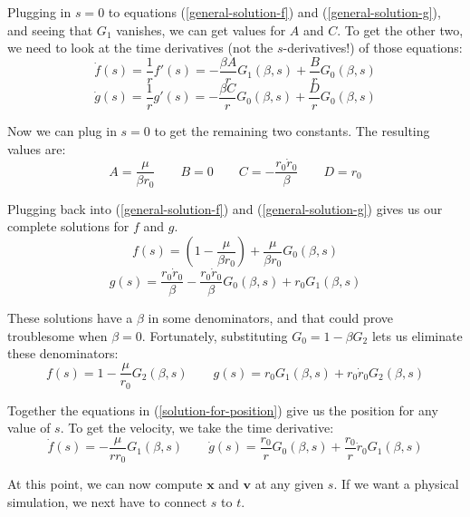 \documentclass{article}
\numberwithin{equation}{subsection}
\begin{document}
Plugging in $s = 0$ to equations (\ref{general-solution-f}) and (\ref{general-solution-g}), and seeing that $G_1$ vanishes, we can get values for $A$ and $C$. To get the other two, we need to look at the time derivatives (not the $s$-derivatives!) of those equations:
\begin{equation}
\dot{f}(s) = \frac{1}{r} f'(s) = -\frac{\beta A}{r} G_1(\beta, s) + \frac{B}{r} G_0(\beta, s)
\end{equation}
\begin{equation}
\dot{g}(s) = \frac{1}{r} g'(s) = -\frac{\beta C}{r} G_0(\beta, s) + \frac{D}{r} G_0(\beta, s)
\end{equation}

Now we can plug in $s = 0$ to get the remaining two constants. The resulting values are:
\begin{equation}
A = \frac{\mu}{\beta r_0} \qquad B = 0 \qquad C = -\frac{r_0 \dot{r}_0}{\beta} \qquad D = r_0
\end{equation}

Plugging back into (\ref{general-solution-f}) and (\ref{general-solution-g}) gives us our complete solutions for $f$ and $g$.
\begin{equation}
f(s) = \left( 1 - \frac{\mu}{\beta r_0} \right) + \frac{\mu}{\beta r_0} G_0(\beta, s)
\end{equation}
\begin{equation}
g(s) = \frac{r_0 \dot{r}_0}{\beta} - \frac{r_0 \dot{r}_0}{\beta} G_0(\beta, s) + r_0 G_1(\beta, s)
\end{equation}

These solutions have a $\beta$ in some denominators, and that could prove troublesome when $\beta = 0$.
Fortunately, substituting $G_0 = 1 - \beta G_2$ lets us eliminate these denominators:
\begin{equation}
\label{solution-for-position}
f(s) = 1 - \frac{\mu}{r_0} G_2(\beta, s)
\qquad
g(s) = r_0 G_1(\beta, s) + r_0 \dot{r}_0 G_2(\beta, s)
\end{equation}

Together the equations in (\ref{solution-for-position}) give us the position for any value of $s$. To get the velocity, we take the time derivative:
\begin{equation}
\label{solution-for-velocity}
\dot f(s) = - \frac{\mu}{r r_0} G_1(\beta, s)
\qquad
\dot g(s) = \frac{r_0}{r} G_0(\beta, s) + \frac{r_0}{r} \dot{r}_0 G_1(\beta, s)
\end{equation}

At this point, we can now compute $\bm x$ and $\bm v$ at any given $s$. If we want a physical simulation, we next have to connect
$s$ to $t$.
\end{document}
